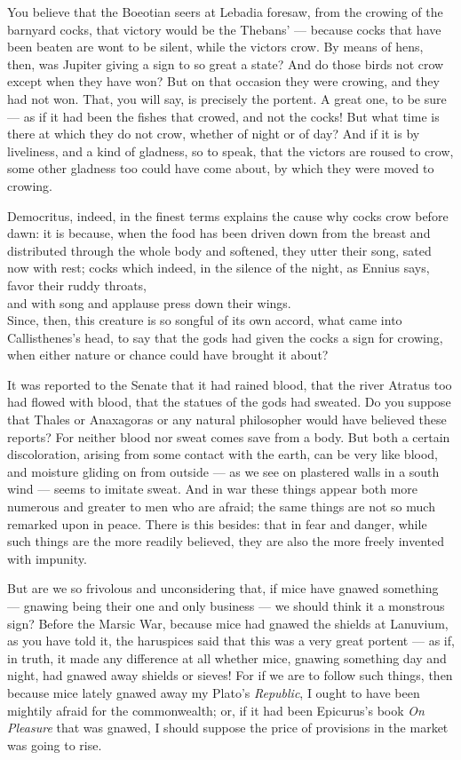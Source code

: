  You believe that the Boeotian seers at Lebadia foresaw, from the crowing of the barnyard cocks, that victory would be the Thebans' — because cocks that have been beaten are wont to be silent, while the victors crow. By means of hens, then, was Jupiter giving a sign to so great a state? And do those birds not crow except when they have won? But on that occasion they were crowing, and they had not won. That, you will say, is precisely the portent. A great one, to be sure — as if it had been the fishes that crowed, and not the cocks! But what time is there at which they do not crow, whether of night or of day? And if it is by liveliness, and a kind of gladness, so to speak, that the victors are roused to crow, some other gladness too could have come about, by which they were moved to crowing.

 Democritus, indeed, in the finest terms explains the cause why cocks crow before dawn: it is because, when the food has been driven down from the breast and distributed through the whole body and softened, they utter their song, sated now with rest; cocks which indeed, in the silence of the night, as Ennius says, \\
favor their ruddy throats, \\
and with song and applause press down their wings. \\
Since, then, this creature is so songful of its own accord, what came into Callisthenes's head, to say that the gods had given the cocks a sign for crowing, when either nature or chance could have brought it about?

 It was reported to the Senate that it had rained blood, that the river Atratus too had flowed with blood, that the statues of the gods had sweated. Do you suppose that Thales or Anaxagoras or any natural philosopher would have believed these reports? For neither blood nor sweat comes save from a body. But both a certain discoloration, arising from some contact with the earth, can be very like blood, and moisture gliding on from outside — as we see on plastered walls in a south wind — seems to imitate sweat. And in war these things appear both more numerous and greater to men who are afraid; the same things are not so much remarked upon in peace. There is this besides: that in fear and danger, while such things are the more readily believed, they are also the more freely invented with impunity.

 But are we so frivolous and unconsidering that, if mice have gnawed something — gnawing being their one and only business — we should think it a monstrous sign? Before the Marsic War, because mice had gnawed the shields at Lanuvium, as you have told it, the haruspices said that this was a very great portent — as if, in truth, it made any difference at all whether mice, gnawing something day and night, had gnawed away shields or sieves! For if we are to follow such things, then because mice lately gnawed away my Plato's \textit{Republic}, I ought to have been mightily afraid for the commonwealth; or, if it had been Epicurus's book \textit{On Pleasure} that was gnawed, I should suppose the price of provisions in the market was going to rise.

